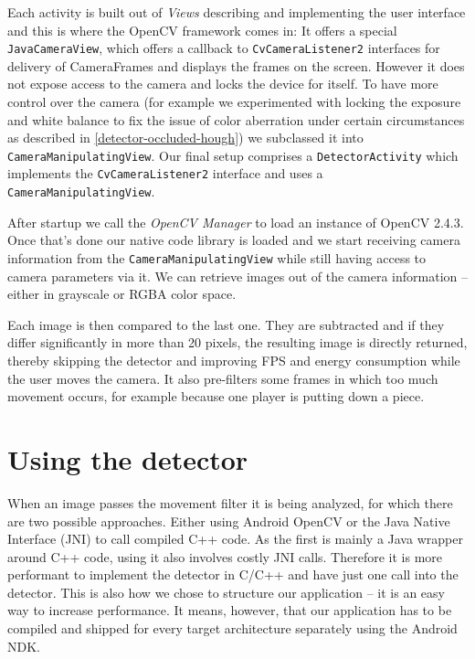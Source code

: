 	Each activity is built out of \textit{Views} describing and implementing the user interface and this is where the OpenCV framework comes in: It offers a special \texttt{JavaCameraView}, which offers a callback to \texttt{CvCameraListener2} interfaces for delivery of CameraFrames and displays the frames on the screen. However it does not expose access to the camera and locks the device for itself. To have more control over the camera (for example we experimented with locking the exposure and white balance to fix the issue of color aberration under certain circumstances as described in \ref{detector-occluded-hough}) we subclassed it into \texttt{CameraManipulatingView}. Our final setup comprises a \texttt{DetectorActivity} which implements the \texttt{CvCameraListener2} interface and uses a \texttt{CameraManipulatingView}.

	After startup we call the \textit{OpenCV Manager} to load an instance of OpenCV 2.4.3. Once that's done our native code library is loaded and we start receiving camera information from the \texttt{CameraManipulatingView} while still having access to camera parameters via it. We can retrieve images out of the camera information -- either in grayscale or RGBA color space.

	Each image is then compared to the last one. They are subtracted and if they differ significantly in more than 20 pixels, the resulting image is directly returned, thereby skipping the detector and improving FPS and energy consumption while the user moves the camera. It also pre-filters some frames in which too much movement occurs, for example because one player is putting down a piece.

	\section{Using the detector}
	\label{android-detector}
	When an image passes the movement filter it is being analyzed, for which there are two possible approaches. Either using Android OpenCV or the Java Native Interface (JNI) to call compiled C++ code. As the first is mainly a Java wrapper around C++ code, using it also involves costly JNI calls. Therefore it is more performant to implement the detector in C/C++ and have just one call into the detector. This is also how we chose to structure our application -- it is an easy way to increase performance. It means, however, that our application has to be compiled and shipped for every target architecture separately using the Android NDK.

